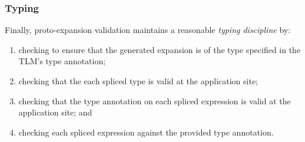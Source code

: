 \documentclass[acmsmall,10pt,review,anonymous]{acmart}\settopmatter{printfolios=true}
\newcommand{\li}[1]{\lstinline{#1}}
\begin{document}

\subsubsection{Typing}
Finally, proto-expansion validation maintains a reasonable \emph{typing discipline} by:
\begin{enumerate}
\item checking to ensure that the generated expansion is of the type specified in the TLM's type annotation; %
\item checking that the each spliced type is valid at the application site; 
\item checking that the type annotation on each spliced expression is valid at the application site; and 
\item checking each spliced expression against the provided type annotation.
\end{enumerate}

\end{document}
